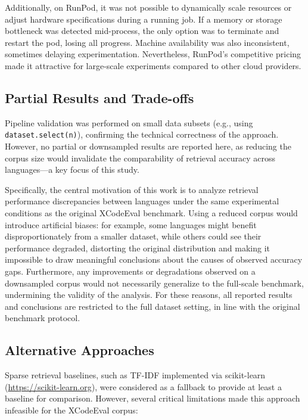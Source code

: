 \documentclass[12pt]{article}
\begin{document}
Additionally, on RunPod, it was not possible to dynamically scale resources or adjust hardware specifications during a running job. If a memory or storage bottleneck was detected mid-process, the only option was to terminate and restart the pod, losing all progress. Machine availability was also inconsistent, sometimes delaying experimentation. Nevertheless, RunPod's competitive pricing made it attractive for large-scale experiments compared to other cloud providers.

\subsection{Partial Results and Trade-offs}

Pipeline validation was performed on small data subsets (e.g., using \texttt{dataset.select(n)}), confirming the technical correctness of the approach. However, no partial or downsampled results are reported here, as reducing the corpus size would invalidate the comparability of retrieval accuracy across languages—a key focus of this study.

Specifically, the central motivation of this work is to analyze retrieval performance discrepancies between languages under the same experimental conditions as the original XCodeEval benchmark. Using a reduced corpus would introduce artificial biases: for example, some languages might benefit disproportionately from a smaller dataset, while others could see their performance degraded, distorting the original distribution and making it impossible to draw meaningful conclusions about the causes of observed accuracy gaps. Furthermore, any improvements or degradations observed on a downsampled corpus would not necessarily generalize to the full-scale benchmark, undermining the validity of the analysis. For these reasons, all reported results and conclusions are restricted to the full dataset setting, in line with the original benchmark protocol.

\subsection{Alternative Approaches}

Sparse retrieval baselines, such as TF-IDF \cite{Ramos2003} implemented via scikit-learn (\url{https://scikit-learn.org}), were considered as a fallback to provide at least a baseline for comparison. However, several critical limitations made this approach infeasible for the XCodeEval corpus:
\end{document}
